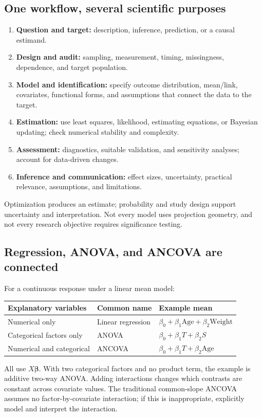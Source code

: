\documentclass[11pt]{article}
\newcommand{\be}{\boldsymbol\beta}\newcommand{\eps}{\boldsymbol\varepsilon}\newcommand{\one}{\mathbf1}\newcommand{\R}{\mathbb R}
\begin{document}
\subsection{One workflow, several scientific purposes}
\begin{enumerate}
\item \textbf{Question and target:} description, inference, prediction, or a causal estimand.
\item \textbf{Design and audit:} sampling, measurement, timing, missingness, dependence, and target population.
\item \textbf{Model and identification:} specify outcome distribution, mean/link, covariates, functional forms, and assumptions that connect the data to the target.
\item \textbf{Estimation:} use least squares, likelihood, estimating equations, or Bayesian updating; check numerical stability and complexity.
\item \textbf{Assessment:} diagnostics, suitable validation, and sensitivity analyses; account for data-driven changes.
\item \textbf{Inference and communication:} effect sizes, uncertainty, practical relevance, assumptions, and limitations.
\end{enumerate}
Optimization produces an estimate; probability and study design support uncertainty and interpretation. Not every model uses projection geometry, and not every research objective requires significance testing.

\subsection{Regression, ANOVA, and ANCOVA are connected}
For a continuous response under a linear mean model:
\par\smallskip
\begin{tabularx}{\linewidth}{p{.30\linewidth}LL}\toprule
Explanatory variables&Common name&Example mean\\\midrule
Numerical only&Linear regression&$\beta_0+\beta_1\mathrm{Age}+\beta_2\mathrm{Weight}$\\
Categorical factors only&ANOVA&$\beta_0+\beta_1T+\beta_2S$\\
Numerical and categorical&ANCOVA&$\beta_0+\beta_1T+\beta_2\mathrm{Age}$\\\bottomrule
\end{tabularx}
\par\smallskip
All use $X\be$. With two categorical factors and no product term, the example is additive two-way ANOVA. Adding interactions changes which contrasts are constant across covariate values. The traditional common-slope ANCOVA assumes no factor-by-covariate interaction; if this is inappropriate, explicitly model and interpret the interaction.
\end{document}
